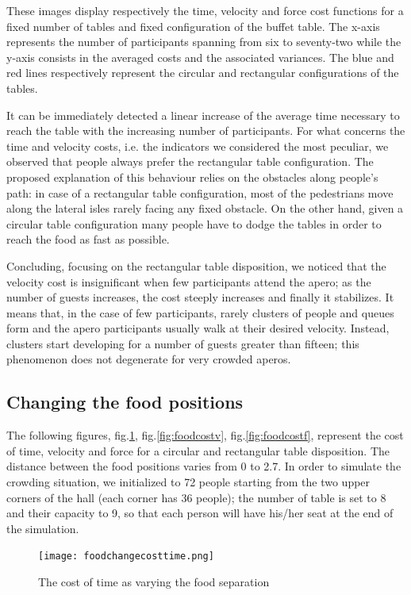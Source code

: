 \documentclass[11pt]{article}
\begin{document}
These images display respectively the time, velocity and force cost functions for a fixed number of tables and fixed configuration of the buffet table. The x-axis represents the number of participants spanning from six to seventy-two while the y-axis consists in the averaged costs and the associated variances. The blue and red lines respectively represent the circular and rectangular configurations of the tables.

It can be immediately detected a linear increase of the average time necessary to reach the table with the increasing number of participants. For what concerns the time and velocity costs, i.e. the indicators we considered the most peculiar, we observed that people always prefer the rectangular table configuration. The proposed explanation of this behaviour relies on the obstacles along people's path: in case of a rectangular table configuration, most of the pedestrians move along the lateral isles rarely facing any fixed obstacle. On the other hand, given a circular table configuration many people have to dodge the tables in order to reach the food as fast as possible.

Concluding, focusing on the rectangular table disposition, we noticed that the velocity cost is insignificant when few participants attend the apero; as the number of guests increases, the cost steeply increases and finally it stabilizes. It means that, in the case of few participants, rarely clusters of people and queues form and the apero participants usually walk at their desired velocity. Instead, clusters start developing for a number of guests greater than fifteen; this phenomenon does not degenerate for very crowded aperos.

\subsection{Changing the food positions}

The following figures, fig.\ref{fig:foodcostt}, fig.\ref{fig:foodcostv}, fig.\ref{fig:foodcostf}, represent the cost of time, velocity and force for a circular and rectangular table disposition. The distance between the food positions varies from 0 to 2.7. In order to simulate the crowding situation, we initialized to 72 people starting from the two upper corners of the hall (each corner has 36 people); the number of table is set to 8 and their capacity to 9, so that each person will have his/her seat at the end of the simulation.
\begin{figure}[ht!]
\centering
\texttt{[image: foodchangecosttime.png]}
\caption{The cost of time as varying the food separation}
\label{fig:foodcostt}
\end{figure}
\end{document}
